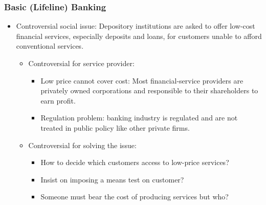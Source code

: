 \subsubsection{Basic (Lifeline) Banking}
\begin{itemize}
\item Controversial social issue: Depository institutions are asked to offer low-cost financial services, especially deposits and loans, for customers unable to afford conventional services.
    \begin{itemize}
    \item Controversial for service provider:
        \begin{itemize}
        \item Low price cannot cover cost: Most financial-service providers are privately owned corporations and responsible to their shareholders to earn profit.
        \item Regulation problem: banking industry is regulated and are not treated in public policy like other private firms.
        \end{itemize}
    \item Controversial for solving the issue:
        \begin{itemize}
        \item How to decide which customers access to low-price
        services?
        \item Insist on imposing a means test on customer?
        \item Someone must bear the cost of producing services but
        who?
        \end{itemize}
    \end{itemize}
    
\end{itemize}



